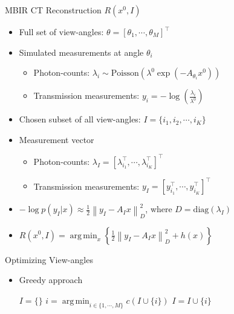 \documentclass[english,aspectratio=169]{beamer}
\DeclareMathOperator*{\argmin}{arg\,min}
\newcommand{\norm}[1]{\left\lVert#1\right\rVert}
\begin{document}
\begin{frame}{MBIR CT Reconstruction $R(x^0,I)$}
	\begin{itemize}
	    \setlength\itemsep{1em}
		\item Full set of view-angles: $\theta = [\theta_1, \cdots, \theta_M ]^\top$
		
		\item Simulated measurements at angle $\theta_i$
		\begin{itemize}
		    \item Photon-counts: $\lambda_i \sim \text{Poisson}\left(\lambda^0 \exp (-A_{\theta_i}x^0) \right)$
		    
		    \item Transmission measurements: $ y_i = - \log\left(\frac{\lambda_i}{\lambda^0}\right) $
		
	    \end{itemize}
	    
		
		\item Chosen subset of all view-angles: $I = \{i_1, i_2, \cdots, i_K \}$
		
		\item Measurement vector 
		\begin{itemize}
		    \item Photon-counts: $\lambda_I = [ \lambda_{i_1}^\top, \cdots, \lambda_{i_K}^\top ]^\top$
		    
		    \item Transmission measurements: 	$y_I = [ y_{i_1}^\top, \cdots, y_{i_K}^\top ]^\top$
		
	    \end{itemize}
		
	
		
		\item $-\log p\left( y_I | x \right) \approx \frac{1}{2} \norm{y_I - A_I x}^2_D $, where $D=\text{diag}(\lambda_I)$
		
		\item $R(x^0,I) = \argmin_x \left\{ \frac{1}{2} \norm{y_I - A_I x}^2_D + h(x) \right\}$
		
		
	\end{itemize}
\end{frame}

\begin{frame}{Optimizing View-angles}
	\begin{itemize}
	    \setlength\itemsep{2em}
		\item Greedy approach
		
		\begin{algorithm}[H]
        \begin{algorithmic}[1]
        \STATE $I = \{\}$
            \STATE  $i = \argmin_{i \in \{1,\cdots,M \} } c(I \cup \{ i \})$
            \STATE $I = I \cup \{ i \}$
        \ENDWHILE
        
        \end{algorithmic}
        \label{alg:angle_greedy}
        \end{algorithm}
        
	\end{itemize}
	
\end{frame}






\end{document}
